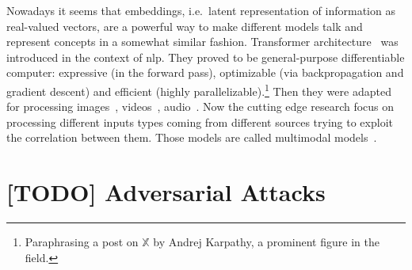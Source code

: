 Nowadays it seems that embeddings, i.e.\ latent representation of information as
real-valued vectors, are a powerful way to make different models talk and
represent concepts in a somewhat similar fashion. Transformer
architecture~\cite{AttentionIsAlVaswan2017} was introduced in the context of
\acrfull{nlp}. They proved to be general-purpose differentiable
computer: expressive (in the forward pass), optimizable (via backpropagation
and gradient descent) and efficient (highly
parallelizable).\footnote{Paraphrasing a post on $\mathbb{X}$ by Andrej
Karpathy, a prominent figure in the field.} Then they were adapted for
processing images~\cite{ImageTransformParmar2018, EndToEndObjeCarion2020,
AnImageIsWorDosovi2020}, videos~\cite{VivitAVideoArnab2021,
TemporalContexShao2020}, audio~\cite{NeuralSpeechSLiNa2018,
SpeechTransforDong2018, ConformerConvGulati2020}. Now the cutting edge research
focus on processing different inputs types coming from different sources trying
to exploit the correlation between them. Those models are called multimodal
models~\cite{ASurveyOnMulYinS2023}.


\section{[TODO] Adversarial Attacks}
\label{sec:adversarial-attacks-related-work}
